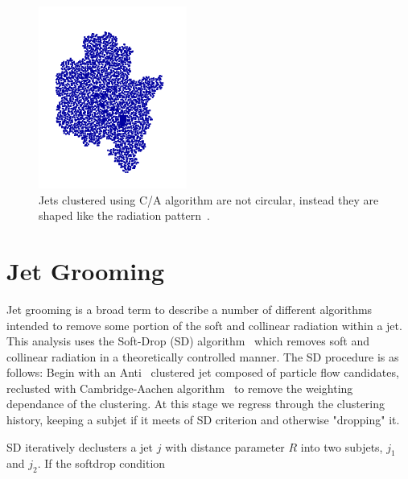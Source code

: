 \begin{figure}[htb]
\centering
\includegraphics[width=.40\textwidth]{visuals/figs_subjet-plots-CA.png}
\caption{Jets clustered using C/A algorithm are not circular, instead they are shaped like the radiation pattern~\cite{Dreyer:2018nbf}.}
\label{fig:cashape}
\end{figure}














\section{Jet Grooming}\label{sec:jetgroom}

Jet grooming is a broad term to describe a number of different algorithms intended to remove some portion of the soft and collinear radiation within a jet. This analysis uses the Soft-Drop (SD) algorithm~\cite{softdrop} which removes soft and collinear radiation in a theoretically controlled manner. The SD procedure is as follows: Begin with an Anti\kt ~\cite{Cacciari:2008gp} clustered jet composed of particle flow candidates, reclusted with Cambridge-Aachen algorithm~\cite{Dokshitzer:1997in} to remove the \pt weighting dependance of the clustering. At this stage we regress through the clustering history, keeping a subjet if it meets of SD criterion and otherwise "dropping" it.


SD iteratively declusters a jet $j$ with distance parameter $R$ into two subjets, $j_1$ and $j_2$.
If the softdrop condition

